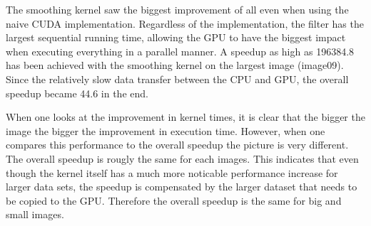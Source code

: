 \documentclass[final]{report}
\begin{document}
The smoothing kernel saw the biggest improvement of all even when using the naive CUDA implementation.
Regardless of the implementation, the filter has the largest sequential running time, allowing the GPU to have the biggest impact when executing everything in a parallel manner.
A speedup as high as 196384.8 has been achieved with the smoothing kernel on the largest image (image09).
Since the relatively slow data transfer between the CPU and GPU, the overall speedup became 44.6 in the end.

When one looks at the improvement in kernel times, it is clear that the bigger the image the bigger the improvement in execution time.
However, when one compares this performance to the overall speedup the picture is very different.
The overall speedup is rougly the same for each images.
This indicates that even though the kernel itself has a much more noticable performance increase for larger data sets, the speedup is compensated by the larger dataset that needs to be copied to the GPU.
Therefore the overall speedup is the same for big and small images.
\end{document}
